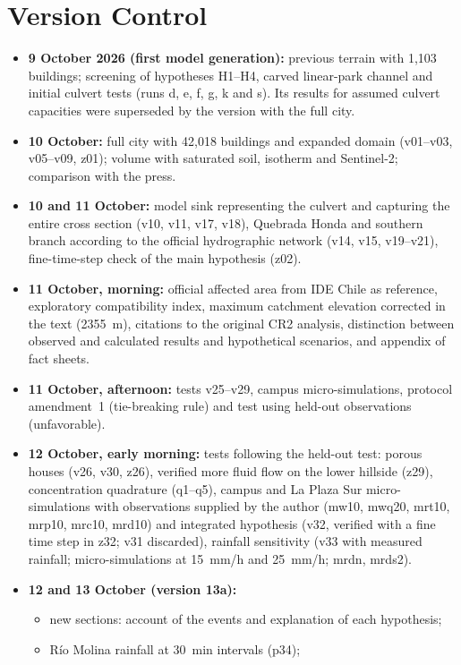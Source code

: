 \section*{Version Control}\label{sec:versiones}
\begin{itemize}
\item \textbf{9 October 2026 (first model generation):} previous terrain with 1,103 buildings; screening of hypotheses H1--H4, carved linear-park channel and initial culvert tests (runs d, e, f, g, k and s). Its results for assumed culvert capacities were superseded by the version with the full city.
\item \textbf{10 October:} full city with 42,018 buildings and expanded domain (v01--v03, v05--v09, z01); volume with saturated soil, isotherm and Sentinel-2; comparison with the press.
\item \textbf{10 and 11 October:} model sink representing the culvert and capturing the entire cross section (v10, v11, v17, v18), Quebrada Honda and southern branch according to the official hydrographic network (v14, v15, v19--v21), fine-time-step check of the main hypothesis (z02).
\item \textbf{11 October, morning:} official affected area from IDE Chile as reference, exploratory compatibility index, maximum catchment elevation corrected in the text (\SI{2355}{m}), citations to the original CR2 analysis, distinction between observed and calculated results and hypothetical scenarios, and appendix of fact sheets.
\item \textbf{11 October, afternoon:} tests v25--v29, campus micro-simulations, protocol amendment~1 (tie-breaking rule) and test using held-out observations (unfavorable).
\item \textbf{12 October, early morning:} tests following the held-out test: porous houses (v26, v30, z26), verified more fluid flow on the lower hillside (z29), concentration quadrature (q1--q5), campus and La Plaza Sur micro-simulations with observations supplied by the author (mw10, mwq20, mrt10, mrp10, mrc10, mrd10) and integrated hypothesis (v32, verified with a fine time step in z32; v31 discarded), rainfall sensitivity (v33 with measured rainfall; micro-simulations at \SI{15}{mm/h} and \SI{25}{mm/h}; mrdn, mrds2).
\item \textbf{12 and 13 October (version 13a):}
\begin{itemize}
\item new sections: account of the events and explanation of each hypothesis;
\item Río Molina rainfall at \SI{30}{min} intervals (p34);

\end{itemize}
\end{itemize}
